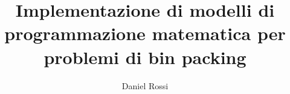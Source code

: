 \title{Implementazione di modelli di programmazione matematica per problemi di bin packing}

\author{Daniel Rossi}


